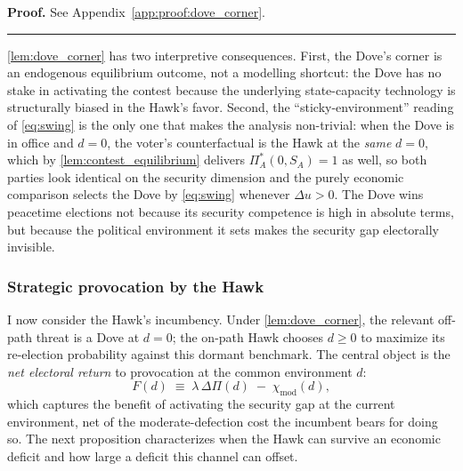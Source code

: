 \documentclass[11pt,twoside]{extarticle}
\newenvironment{proof}[1][Proof]{\noindent \textbf{#1.} }{\ \rule{0.5em}{0.5em}}
\begin{document}
\begin{proof}
See Appendix~\autoref{app:proof:dove_corner}.
\end{proof}

\autoref{lem:dove_corner} has two interpretive consequences. First, the Dove's corner is an endogenous equilibrium outcome, not a modelling shortcut: the Dove has no stake in activating the contest because the underlying state-capacity technology is structurally biased in the Hawk's favor. Second, the ``sticky-environment'' reading of \autoref{eq:swing} is the only one that makes the analysis non-trivial: when the Dove is in office and $d=0$, the voter's counterfactual is the Hawk at the \emph{same} $d=0$, which by \autoref{lem:contest_equilibrium} delivers $\Pi_A^*(0,S_A)=1$ as well, so both parties look identical on the security dimension and the purely economic comparison selects the Dove by \autoref{eq:swing} whenever $\Delta u>0$. The Dove wins peacetime elections not because its security competence is high in absolute terms, but because the political environment it sets makes the security gap electorally invisible.

\subsubsection*{Strategic provocation by the Hawk}

I now consider the Hawk's incumbency. Under \autoref{lem:dove_corner}, the relevant off-path threat is a Dove at $d=0$; the on-path Hawk chooses $d\ge 0$ to maximize its re-election probability against this dormant benchmark. The central object is the \emph{net electoral return} to provocation at the common environment $d$:
\begin{equation} \label{eq:F_prov}
F(d)\;\equiv\;\lambda\,\Delta\Pi(d)\;-\;\chi_{\mathrm{mod}}(d),
\end{equation}
which captures the benefit of activating the security gap at the current environment, net of the moderate-defection cost the incumbent bears for doing so. The next proposition characterizes when the Hawk can survive an economic deficit and how large a deficit this channel can offset.
\end{document}
